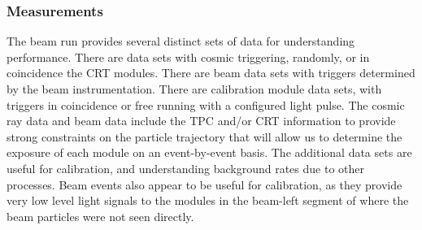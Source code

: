 

\subsubsection{  Measurements}
\label{sec:protodune-results}


The  beam run provides several distinct sets of data for understanding  performance.  
There are data sets with cosmic triggering, randomly, or in coincidence the CRT modules.
There are beam data sets with triggers determined by the beam instrumentation.
There are calibration module data sets, with triggers in coincidence or free running with a configured light pulse. The cosmic ray data and beam data include the TPC and/or CRT information to provide strong constraints on the particle trajectory that will allow us to determine the exposure of each module on an event-by-event basis.  The additional data sets are useful for calibration, and understanding background rates due to other processes.  Beam events also appear to be useful for calibration, as they provide very low level light signals to the modules in the beam-left segment of  where the beam particles were not seen directly.


